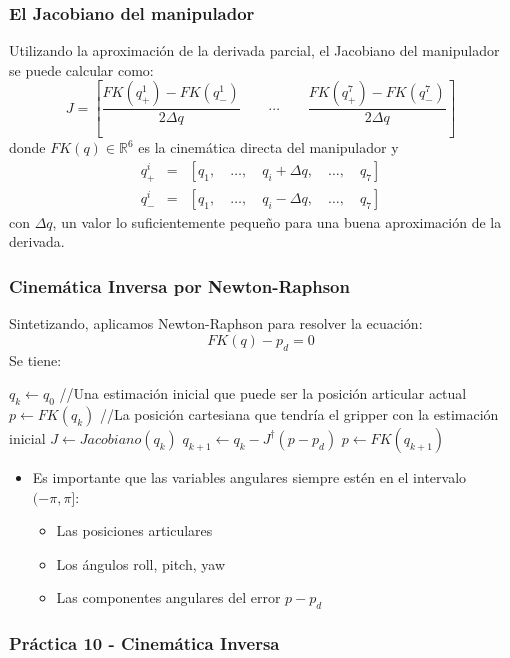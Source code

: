 \begin{frame}\frametitle{El Jacobiano del manipulador}
  Utilizando la aproximación de la derivada parcial, el Jacobiano del manipulador se puede calcular como:
  \[J = \left[\frac{FK(q^1_{+}) -  FK(q^1_{-})}{2\Delta q} \qquad \cdots \qquad \frac{FK(q^7_{+}) -  FK(q^7_{-})}{2\Delta q}\right]\]
  donde $FK(q)\in\mathbb{R}^6$ es la cinemática directa del manipulador y 
  \begin{eqnarray*}
    q^i_+ &=& [q_1,\quad \dots, \quad q_i + \Delta q, \quad \dots, \quad q_7]\\
    q^i_- &=& [q_1,\quad \dots, \quad q_i - \Delta q, \quad \dots, \quad q_7]
  \end{eqnarray*}
  con $\Delta q$, un valor lo suficientemente pequeño para una buena aproximación de la derivada. 

\end{frame}

\begin{frame}\frametitle{Cinemática Inversa por Newton-Raphson}
  Sintetizando, aplicamos Newton-Raphson para resolver la ecuación:
  \[FK(q) - p_d = 0\]
  Se tiene:
  \begin{algorithm}[H]
    \DontPrintSemicolon
    $q_k \leftarrow q_0$ //Una estimación inicial que puede ser la posición articular actual\;
    $p \leftarrow FK(q_k)$ //La posición cartesiana que tendría el gripper con la estimación inicial\;
    {
      $J \leftarrow Jacobiano(q_k)$     \;
      $q_{k+1} \leftarrow q_k - J^\dagger (p - p_d)$\;
      $p \leftarrow FK(q_{k+1})$ 
    }
  \end{algorithm}
  \begin{itemize}
  \item Es importante que las variables angulares siempre estén en el intervalo $(-\pi, \pi]$:
    \begin{itemize}
    \item Las posiciones articulares
    \item Los ángulos roll, pitch, yaw
    \item Las componentes angulares del error $p - p_d$
    \end{itemize}
  \end{itemize}
\end{frame}

\begin{frame}\frametitle{Práctica 10 - Cinemática Inversa}
\end{frame}

